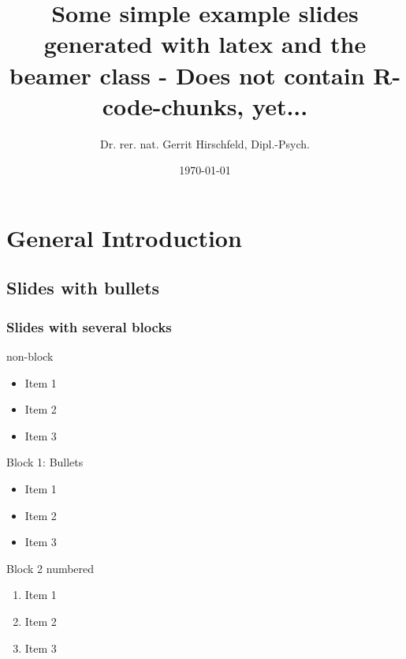 \documentclass{beamer}					%
\begin{document}
\title[Beamer-Example]{Some simple example slides generated with latex and the beamer class - Does not contain R-code-chunks, yet...}
\author[Dr. Hirschfeld]{Dr. rer. nat. Gerrit Hirschfeld, Dipl.-Psych.}
\date{\today} 

\begin{frame}
\titlepage
\end{frame}

\begin{frame}\frametitle{}
	\tableofcontents
\end{frame} 


\section{General Introduction} 
\subsection{Slides with bullets}

\begin{frame}\frametitle{Slides with several blocks}
	non-block
	\begin{itemize}
	\item Item 1	
	\item Item 2
	\item Item 3
	\end{itemize}
	\begin{block}{Block 1: Bullets }
		\begin{itemize}
		\item Item 1
		\item Item 2
		\item Item 3
		\end{itemize}
	\end{block}
	\pause							%
	\begin{block}{Block 2 numbered}
		\begin{enumerate}
		\item Item 1
		\item Item 2
		\item Item 3
		\end{enumerate}
	\end{block}
\end{frame}
\end{document}
